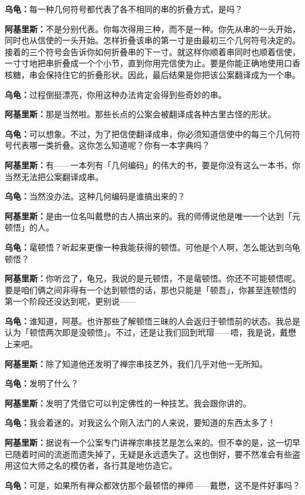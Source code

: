 \documentclass[
  12pt,
  twoside,
  openright,
  oldfontcommands,
]{memoir}
\newcommand{\dialogname}[1]{{\heifamily\bfseries #1}}
\begin{document}
\dialogname{乌龟：}每一种几何符号都代表了各不相同的串的折叠方式，是吗？

\dialogname{阿基里斯：}不是分别代表。你每次得用三种，而不是一种。你先从串的一头开始，同时也从信使的一头开始。怎样折叠该串的第一寸是由最初三个几何符号决定的。接着的三个符号会告诉你如何折叠串的下一寸。就这样你顺着串同时也顺着信使，一寸寸地把串折叠成一个个小节，直到你用完信使为止。要是你能正确地使用口香核糖，串会保持住它的折叠形状。因此，最后结果是你把该公案翻译成为一个串。

\dialogname{乌龟：}过程倒挺漂亮，你用这种办法肯定会得到些奇妙的串。

\dialogname{阿基里斯：}那是当然啦。那些长点的公案会被翻译成各种古里古怪的形状。

\dialogname{乌龟：}可以想象。不过，为了把信使翻译成串，你必须知道信使中的每三个几何符号代表哪一类折叠。这你怎么知道呢？你有一本字典吗？

\dialogname{阿基里斯：}有------一本列有「几何编码」的伟大的书，要是你没有这么一本书，你当然无法把公案翻译成串。

\dialogname{乌龟：}当然没办法。这种几何编码是谁搞出来的？

\dialogname{阿基里斯：}是由一位名叫戴懋的古人搞出来的。我的师傅说他是唯一一个达到「元顿悟」的人。

\dialogname{乌龟：}鼋顿悟？听起来更像一种我能获得的顿悟。可他是个人啊，怎么能达到乌龟顿悟？

\dialogname{阿基里斯：}你听岔了，龟兄，我说的是元顿悟，不是鼋顿悟。你还不可能顿悟呢。要是咱们俩之间非得有一个达到顿悟的话，那也只能是「顿吾」，你甚至连顿悟的第一个阶段还没达到呢，更别说------

\dialogname{乌龟：}谁知道，阿基。也许那些了解顿悟三昧的人会返归于顿悟前的状态。我总是认为「顿悟两次即是没顿悟」。不过，还是让我们回到玳瑁------唔，我是说，戴懋上来吧。

\dialogname{阿基里斯：}除了知道他还发明了禅宗串技艺外，我们几乎对他一无所知。

\dialogname{乌龟：}发明了什么？

\dialogname{阿基里斯：}发明了凭借它可以判定佛性的一种技艺。我会跟你讲的。

\dialogname{乌龟：}我会着迷的。对我这么个刚入法门的人来说，要知道的东西太多了！

\dialogname{阿基里斯：}据说有一个公案专门讲禅宗串技艺是怎么来的。但不幸的是，这一切早已随着时间的流逝而遗失掉了，无疑是永远遗失了。这也倒好，要不然准会有些盗用这位大师之名的模仿者，各行其是地仿造它。

\dialogname{乌龟：}可是，如果所有禅众都效仿那个最顿悟的禅师------戴懋，这不是件好事吗？
\end{document}
